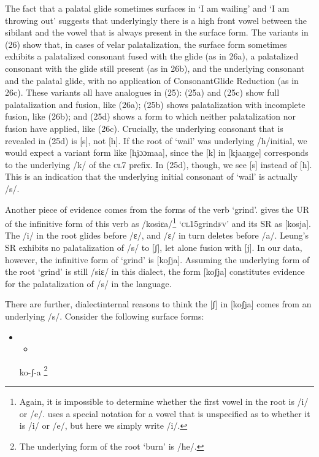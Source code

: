 \documentclass[output=paper]{langsci/langscibook}
\begin{document}
The fact that a palatal glide sometimes surfaces in ‘I am wailing’ and ‘I am throwing out’ suggests that underlyingly there is a high front vowel between the sibilant and the vowel that is always present in the surface form. The variants in (26) show that, in cases of velar palatalization, the surface form sometimes exhibits a palatalized consonant fused with the glide (as in 26a), a palatalized consonant with the glide still present (as in 26b), and the underlying consonant and the palatal glide, with no application of ConsonantGlide Reduction (as in 26c). These variants all have analogues in (25): (25a) and (25c) show full palatalization and fusion, like (26a); (25b) shows palatalization with incomplete fusion, like (26b); and (25d) shows a form to which neither palatalization nor fusion have applied, like (26c). Crucially, the underlying consonant that is revealed in (25d) is [s], not [h]. If the root of ‘wail’ was underlying /h/initial, we would expect a variant form like [hjɔɔmaa], since the [k] in [kjaaŋge] corresponds to the underlying /k/ of the \textsc{cl}7 prefix. In (25d), though, we see [s] instead of [h]. This is an indication that the underlying initial consonant of ‘wail’ is actually /s/. 

Another piece of evidence comes from the forms of the verb ‘grind’. \citet{Leung1991} gives the UR of the infinitive form of this verb as /kosiɛa/\footnote{   Again, it is impossible to determine whether the first vowel in the root is /i/ or /e/. \citet{Leung1991} uses a special notation for a vowel that is unspecified as to whether it is /i/ or /e/, but here we simply write /i/. } ‘\textsc{cl}15grind\textsc{fv}’ and its SR as [kosja]. The /i/ in the root glides before /ɛ/, and /ɛ/ in turn deletes before /a/. Leung’s SR exhibits no palatalization of /s/ to [ʃ], let alone fusion with [j]. In our data, however, the infinitive form of ‘grind’ is [koʃja]. Assuming the underlying form of the root ‘grind’ is still /siɛ/ in this dialect, the form [koʃja] constitutes evidence for the palatalization of /s/ in the language. 

There are further, dialectinternal reasons to think the [ʃ] in [koʃja] comes from an underlying /s/. Consider the following surface forms:

\setcounter{itemize}{0}
\begin{itemize}
\item \setcounter{itemize}{0}
\begin{itemize}
\item \end{itemize}
\end{itemize}
\setcounter{itemize}{0}
\begin{itemize}
\item [ko-ʃ{}-a]\footnote{   The underlying form of the root ‘burn’ is /he/. }

\end{itemize}
\end{document}
